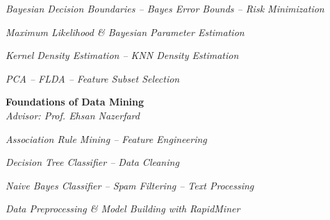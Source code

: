 \documentclass[margin, 10pt]{res} %
\begin{document}
\begin{resume}
\begin{innerlist}
			\item \textit{Bayesian Decision Boundaries -- Bayes Error Bounds -- Risk Minimization} \href{https://github.com/aligholamee/Patterns/raw/master/docs/assignment-2/SPR_9531504_HW2.pdf}{\hfill\UrlFont[docs]}

			\item \textit{Maximum Likelihood \& Bayesian Parameter Estimation} \href{https://github.com/aligholamee/Patterns/raw/master/docs/assignment-3/SPR_9531504_HW3.pdf}{\hfill\UrlFont[docs]}
			
			
			\item \textit{Kernel Density Estimation -- KNN Density Estimation} \href{https://github.com/aligholamee/Patterns/raw/master/docs/assignment-4/SPR_9531504_HW4.pdf}{\hfill\UrlFont[docs]}
			
			\item \textit{PCA -- FLDA -- Feature Subset Selection} \href{https://github.com/aligholamee/Patterns/raw/master/docs/assignment-5/SPR_9531504_HW5.pdf}{\hfill\UrlFont[docs]}
		\end{innerlist}

        \textbf{Foundations of Data Mining}\\
		\textit{Advisor: Prof. Ehsan Nazerfard}
		\begin{innerlist}
			\item \textit{Association Rule Mining -- Feature Engineering} \href{https://github.com/aligholamee/Datadigger/raw/master/docs/assignment-1/report/DM_9531504_HW1.pdf}{\hfill\UrlFont[docs]}
			
			\item \textit{Decision Tree Classifier -- Data Cleaning} \href{https://github.com/aligholamee/Datadigger/raw/master/docs/assignment-2/report/DM_9531504_HW2.pdf}{\hfill\UrlFont[docs]}
			
			\item \textit{Naive Bayes Classifier -- Spam Filtering -- Text Processing} \href{https://github.com/aligholamee/Datadigger/raw/master/docs/assignment-3/report/DM_9531504_HW3.pdf}{\hfill\UrlFont[docs]}
			
			\item \textit{Data Preprocessing \& Model Building with \textit{RapidMiner}} \href{https://github.com/aligholamee/Datadigger/raw/master/docs/assignment-4/report/DM_9531504_HW4.pdf}{\hfill\UrlFont[docs]}
		\end{innerlist}


\end{resume}
\end{document}
